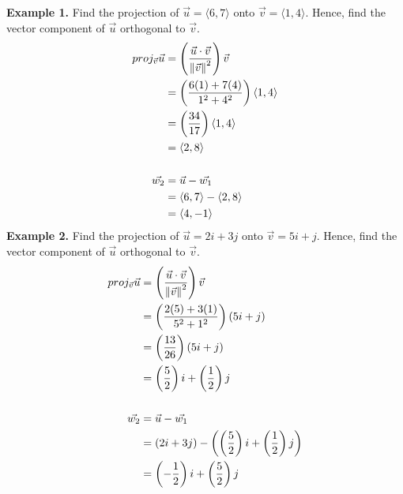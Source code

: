 \newpage
\noindent\textbf{Example 1. } Find the projection of $\vec{u} = \langle 6, 7 \rangle$ onto $\vec{v} = \langle 1, 4 \rangle$. Hence, find the vector component of $\vec{u}$ orthogonal to $\vec{v}$.
\begin{align*}
    proj_{\vec{v}}\vec{u} & = \left(\frac{\vec{u} \cdot \vec{v}}{\left\lVert\vec{v}\right\rVert^2}\right)\vec{v} \\
                          & = \left(\frac{6(1) + 7(4)}{1^2 + 4^2}\right)\langle 1, 4 \rangle     \\
                          & = \left(\frac{34}{17}\right)\langle 1, 4 \rangle                     \\
                          & = \langle 2, 8 \rangle                                               \\
    \\
    \vec{w_2}             & = \vec{u} - \vec{w_1}                                                \\
                          & = \langle 6, 7 \rangle - \langle 2, 8 \rangle                        \\
                          & = \langle 4, -1 \rangle
\end{align*}
\noindent\textbf{Example 2. } Find the projection of $\vec{u} = 2i + 3j$ onto $\vec{v} = 5i + j$. Hence, find the vector component of $\vec{u}$ orthogonal to $\vec{v}$.
\begin{align*}
    proj_{\vec{v}}\vec{u} & = \left(\frac{\vec{u} \cdot \vec{v}}{\left\lVert\vec{v}\right\rVert^2}\right)\vec{v}             \\
                          & = \left(\frac{2(5) + 3(1)}{5^2 + 1^2}\right)(5i + j)                             \\
                          & = \left(\frac{13}{26}\right)(5i + j)                                             \\
                          & = \left(\frac{5}{2}\right)i + \left(\frac{1}{2}\right)j                          \\
    \\
    \vec{w_2}             & = \vec{u} - \vec{w_1}                                                            \\
                          & = (2i + 3j) - \left(\left(\frac{5}{2}\right)i + \left(\frac{1}{2}\right)j\right) \\
                          & = \left(-\frac{1}{2}\right)i + \left(\frac{5}{2}\right)j
\end{align*}

